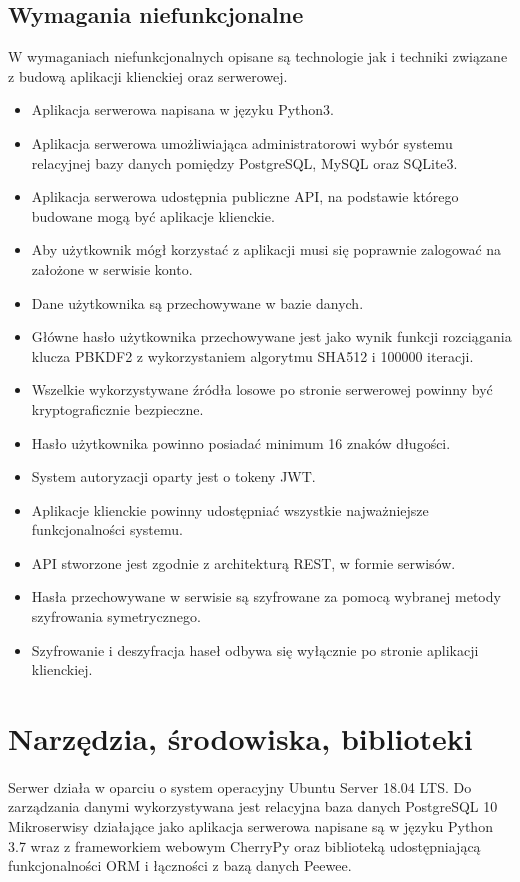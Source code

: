 \documentclass{article}
\begin{document}
    \subsection{Wymagania niefunkcjonalne}
    W wymaganiach niefunkcjonalnych opisane są technologie jak i techniki związane z budową aplikacji klienckiej oraz serwerowej.
	\begin{itemize}
		\item Aplikacja serwerowa napisana w języku Python3.
		\item Aplikacja serwerowa umożliwiająca administratorowi wybór systemu relacyjnej bazy danych pomiędzy PostgreSQL, MySQL oraz SQLite3.
		\item Aplikacja serwerowa udostępnia publiczne API, na podstawie którego budowane mogą być aplikacje klienckie.
		\item Aby użytkownik mógł korzystać z aplikacji musi się poprawnie zalogować na założone w serwisie konto.
		\item Dane użytkownika są przechowywane w bazie danych.
		\item Główne hasło użytkownika przechowywane jest jako wynik funkcji rozciągania klucza PBKDF2 z wykorzystaniem algorytmu SHA512 i 100000 iteracji.
		\item Wszelkie wykorzystywane źródła losowe po stronie serwerowej powinny być kryptograficznie bezpieczne.
		\item Hasło użytkownika powinno posiadać minimum 16 znaków długości.
		\item System autoryzacji oparty jest o tokeny JWT.
		\item Aplikacje klienckie powinny udostępniać wszystkie najważniejsze funkcjonalności systemu.
		\item API stworzone jest zgodnie z architekturą REST, w formie serwisów.
		\item Hasła przechowywane w serwisie są szyfrowane za pomocą wybranej metody szyfrowania symetrycznego.
		\item Szyfrowanie i deszyfracja haseł odbywa się wyłącznie po stronie aplikacji klienckiej.
	\end{itemize}

    \section{Narzędzia, środowiska, biblioteki}
    \paragraph{}Serwer działa w oparciu o system operacyjny Ubuntu Server 18.04 LTS.
	Do zarządzania danymi wykorzystywana jest relacyjna baza danych PostgreSQL 10
	Mikroserwisy działające jako aplikacja serwerowa napisane są w języku Python 3.7 wraz z frameworkiem webowym CherryPy oraz biblioteką udostępniającą funkcjonalności ORM i łączności z bazą danych Peewee.
\end{document}
